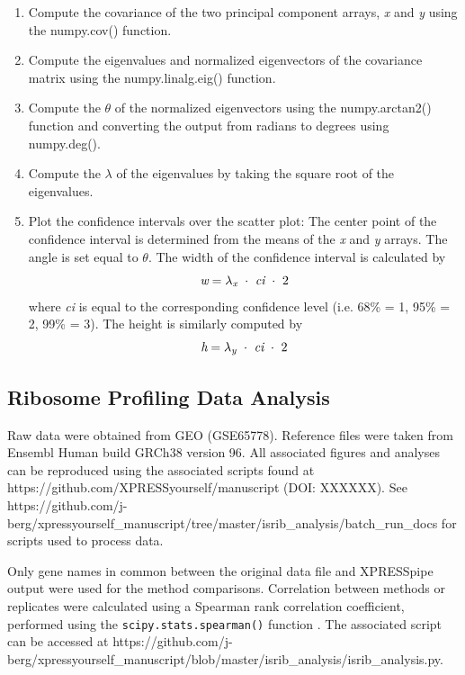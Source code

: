 \documentclass[11pt, a4paper, oneside]{article}
\begin{document}
\begin{enumerate}
  \item Compute the covariance of the two principal component arrays, \textit{x} and \textit{y} using the numpy.cov() function.

  \item Compute the eigenvalues and normalized eigenvectors of the covariance matrix using the numpy.linalg.eig() function.

  \item Compute the $\theta$ of the normalized eigenvectors using the numpy.arctan2() function and converting the output from radians to degrees using numpy.deg().

  \item Compute the $\lambda$ of the eigenvalues by taking the square root of the eigenvalues.

  \item Plot the confidence intervals over the scatter plot: The center point of the confidence interval is determined from the means of the \textit{x} and \textit{y} arrays. The angle is set equal to $\theta$. The width of the confidence interval is calculated by
  \[
  \textit{w} = \lambda _{\textit{\scriptsize{x}}}\ \cdot\ \textit{ci}\ \cdot\ 2
  \]
  where \textit{ci} is equal to the corresponding confidence level (i.e. 68\% = 1, 95\% = 2, 99\% = 3). The height is similarly computed by
  \[
  \textit{h} = \lambda _{\textit{\scriptsize{y}}}\ \cdot\ \textit{ci}\ \cdot\ 2
  \]
\end{enumerate}

\subsection{Ribosome Profiling Data Analysis}
Raw data were obtained from GEO (GSE65778). Reference files were taken from Ensembl Human build GRCh38 version 96. All associated figures and analyses can be reproduced using the associated scripts found at https://github.com/XPRESSyourself/manuscript (DOI: XXXXXX). See https://github.com/j-berg/xpressyourself\_manuscript/tree/master/isrib\_analysis/batch\_run\_docs for scripts used to process data. \par

Only gene names in common between the original data file and XPRESSpipe output were used for the method comparisons. Correlation between methods or replicates were calculated using a Spearman rank correlation coefficient, performed using the \texttt{scipy.stats.spearman()} function \cite{spearman_rnaseq}. The associated script can be accessed at https://github.com/j-berg/xpressyourself\_manuscript/blob/master/isrib\_analysis/isrib\_analysis.py. \par
\end{document}
